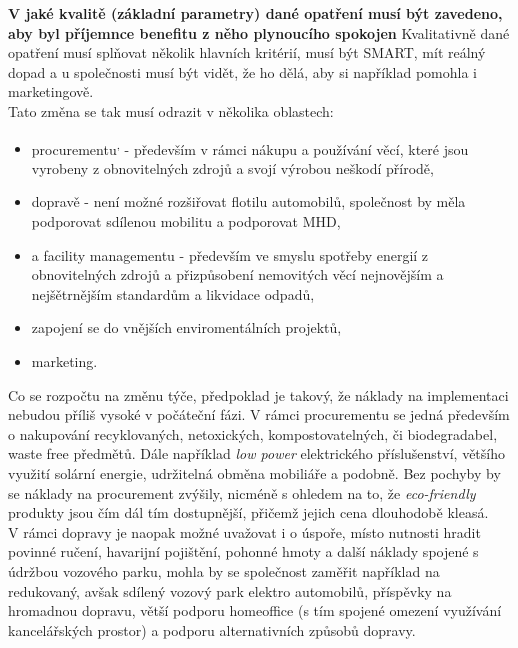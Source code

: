 \textbf{V jaké kvalitě (základní parametry) dané opatření musí být zavedeno, aby byl příjemnce benefitu z něho plynoucího spokojen} Kvalitativně dané opatření musí splňovat několik hlavních kritérií, musí být SMART, mít reálný dopad a u společnosti musí být vidět, že ho dělá, aby si například pomohla i marketingově.\\

Tato změna se tak musí odrazit v několika oblastech:

\begin{itemize}
	\item procurementu\textsuperscript{,} - především v rámci nákupu a používání věcí, které jsou vyrobeny z obnovitelných zdrojů a svojí výrobou neškodí přírodě,
	\item dopravě - není možné rozšiřovat flotilu automobilů, společnost by měla podporovat sdílenou mobilitu a podporovat MHD,
	\item a facility managementu - především ve smyslu spotřeby energií z obnovitelných zdrojů a přizpůsobení nemovitých věcí nejnovějším a nejšětrnějším standardům a likvidace odpadů,
	\item zapojení se do vnějších enviromentálních projektů,
	\item marketing.
\end{itemize}

Co se rozpočtu na změnu týče, předpoklad je takový, že náklady na implementaci nebudou příliš vysoké v počáteční fázi. V rámci procurementu se jedná především o nakupování recyklovaných, netoxických, kompostovatelných, či biodegradabel, waste free předmětů. Dále například \textit{low power} elektrického příslušenství, většího využití solární energie, udržitelná obměna mobiliáře a podobně. Bez pochyby by se náklady na procurement zvýšily, nicméně s ohledem na to, že \textit{eco-friendly} produkty jsou čím dál tím dostupnější, přičemž jejich cena dlouhodobě kleasá.\\

V rámci dopravy je naopak možné uvažovat i o úspoře, místo nutnosti hradit povinné ručení, havarijní pojištění, pohonné hmoty a další náklady spojené s údržbou vozového parku, mohla by se společnost zaměřit například na redukovaný, avšak sdílený vozový park elektro automobilů, příspěvky na hromadnou dopravu, větší podporu homeoffice (s tím spojené omezení využívání kancelářských prostor) a podporu alternativních způsobů dopravy.\\

